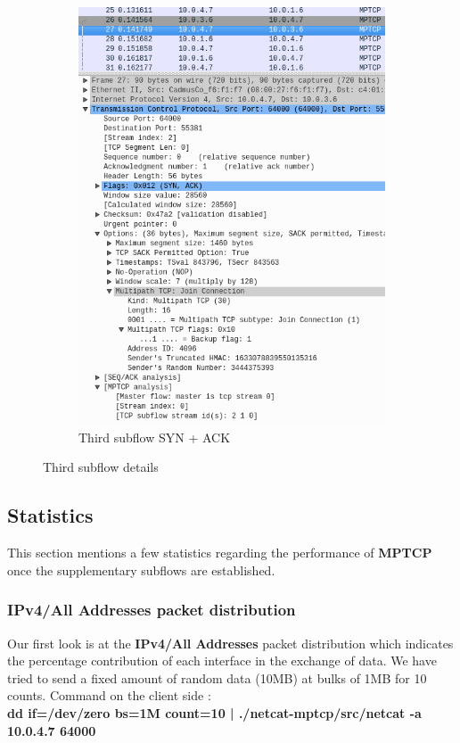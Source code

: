 \documentclass[a4paper,11pt]{article}
\begin{document}
\begin{figure}[h!]
\begin{subfigure}{.5\textwidth}
			  \includegraphics[width=.8\linewidth]{pictures/thirdflowresponse.jpg}
			  \caption{Third subflow SYN + ACK}
			\end{subfigure}
			\caption{Third subflow details}
			\end{figure}


	\clearpage
		\subsection{Statistics}
			\label{subsec:statistics}
			This section mentions a few statistics regarding the performance of \textbf{MPTCP} once the supplementary subflows are established.\\
			\subsubsection{IPv4/All Addresses packet distribution}
			\label{subsubsec:packetdistribution}
			Our first look is at the \textbf{IPv4/All Addresses} packet distribution which indicates the percentage contribution of each interface in the exchange of data. We have tried to send a fixed amount of random data (10MB) at bulks of 1MB for 10 counts. Command on the client side :\\
			\textbf{dd if=/dev/zero bs=1M count=10 | ./netcat-mptcp/src/netcat -a 10.0.4.7 64000}
\end{document}
